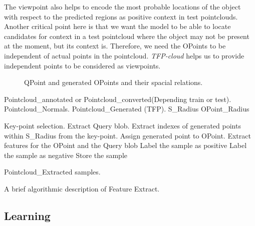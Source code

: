 The viewpoint also helps to encode the most probable locations of the object with respect to the predicted regions as positive context in test pointclouds. Another critical point here is that we want the model to be able to locate candidates for context in a test pointcloud where the object may not be present at the moment, but its context is. Therefore, we need the OPoints to be independent of actual points in the pointcloud.
{\it TFP-cloud} helps us to provide independent points to be considered as viewpoints.




\begin{figure}[t]
  \caption[Feature extract structure]
  {QPoint and generated OPoints and their spacial relations.}
  \label{PointParameters_Diagram.figure}
\end{figure}

\begin{algorithm}[t]
\begin{algorithmic}[1]
\REQUIRE Pointcloud\_annotated or Pointcloud\_converted(Depending train or test).
\REQUIRE Pointcloud\_Normals.
\REQUIRE Pointcloud\_Generated (TFP).
\REQUIRE S\_Radius
\REQUIRE OPoint\_Radius
\medskip

\STATE Key-point selection.
  \STATE Extract Query blob.
  \STATE Extract indexes of generated points within S\_Radius from the key-point.
    \STATE Assign generated point to OPoint.
    \STATE Extract features for the OPoint and the Query blob
	\STATE Label the sample as positive
      \ELSE
	\STATE Label the sample as negative
      \ENDIF
     \ENDIF
   \ENDFOR
     \STATE Store the sample
\ENDFOR

\medskip
\ENSURE Pointcloud\_Extracted samples.
\end{algorithmic}
\caption[Feature Extract.]
{A brief algorithmic description of Feature Extract.}
\label{FeatureEXtract.algorithm}
\end{algorithm}





\subsection{Learning}
\label{Learning.ssec}

